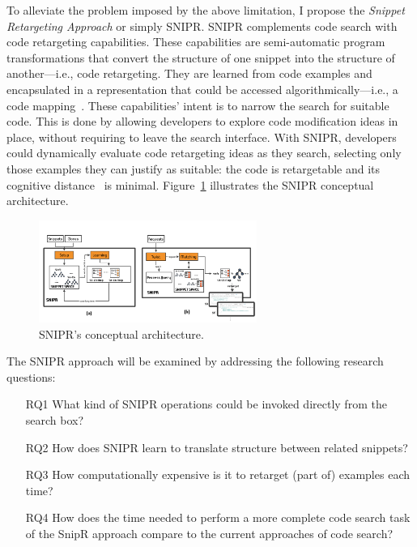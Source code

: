 \documentclass[conference]{IEEEtran}
\begin{document}
To alleviate the problem imposed by the above limitation, I propose the \emph{Snippet Retargeting Approach} or simply \uppercase{SnipR}. \uppercase{SnipR} complements code search with code retargeting capabilities. These capabilities are semi-automatic program transformations that convert the structure of one snippet into the structure of another---i.e., code retargeting. They are learned from code examples and encapsulated in a representation that could be accessed algorithmically---i.e., a code mapping~\cite{Nita:2010en}. These capabilities' intent is to narrow the search for suitable code. This is done by allowing developers to explore code modification ideas in place, without requiring to leave the search interface. With \uppercase{SNIPR}, developers could dynamically evaluate code retargeting ideas as they search, selecting only those examples they can justify as suitable: the code is retargetable and its cognitive distance~\cite{Krueger:1992wf} is minimal. Figure~\ref{fig:architecture} illustrates the \uppercase{SnipR} conceptual architecture.

\begin{figure}[!t]
    \centering
    \includegraphics[width=2.8in]{images/SnippetRetargetingApproach}
    \caption{\uppercase{SnipR}'s conceptual architecture.}
    \label{fig:architecture}
\end{figure}

The \uppercase{SnipR} approach will be examined by addressing the following research questions:

\begin{itemize}  
\item[RQ1] What kind of \uppercase{SnipR} operations could be invoked directly from the search box?
\item[RQ2] How does \uppercase{SnipR} learn to translate structure between related snippets?
\item[RQ3] How computationally expensive is it to retarget (part of) examples each time?
\item[RQ4] How does the time needed to perform a more complete code search task of the SnipR approach compare to the current approaches of code search? 
\end{itemize}
\end{document}
